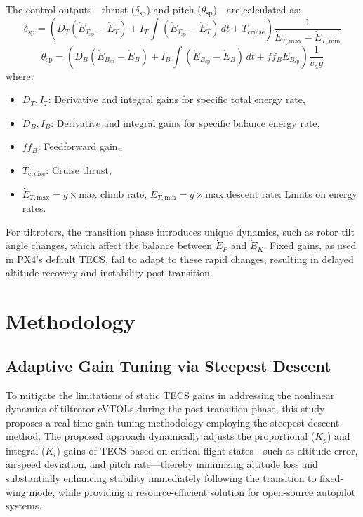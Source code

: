 \documentclass[journal,article,submit,pdftex,moreauthors]{Definitions/mdpi}
\begin{document}
The control outputs—thrust (\(\delta_{\text{sp}}\)) and pitch (\(\theta_{\text{sp}}\))—are calculated as:
\begin{equation}
    \delta_{\text{sp}} = \left( D_T (\dot{E}_{T_{\text{sp}}} - \dot{E}_T) + I_T \int (\dot{E}_{T_{\text{sp}}} - \dot{E}_T) \, dt + T_{\text{cruise}} \right) \frac{1}{\dot{E}_{T,\text{max}} - \dot{E}_{T,\text{min}}}
\end{equation}
\begin{equation}
    \theta_{\text{sp}} = \left( D_B (\dot{E}_{B_{\text{sp}}} - \dot{E}_B) + I_B \int (\dot{E}_{B_{\text{sp}}} - \dot{E}_B) \, dt + ff_B \dot{E}_{B_{\text{sp}}} \right) \frac{1}{v_a g}
\end{equation}
where:
\begin{itemize}
    \item \(D_T, I_T\): Derivative and integral gains for specific total energy rate,
    \item \(D_B, I_B\): Derivative and integral gains for specific balance energy rate,
    \item \(ff_B\): Feedforward gain,
    \item \(T_{\text{cruise}}\): Cruise thrust,
    \item \(\dot{E}_{T,\text{max}} = g \times \text{max\_climb\_rate}\), \(\dot{E}_{T,\text{min}} = g \times \text{max\_descent\_rate}\): Limits on energy rates.
\end{itemize}

For tiltrotors, the transition phase introduces unique dynamics, such as rotor tilt angle changes, which affect the balance between \(\dot{E}_P\) and \(\dot{E}_K\). Fixed gains, as used in PX4’s default TECS, fail to adapt to these rapid changes, resulting in delayed altitude recovery and instability post-transition.

\section{Methodology}

\subsection{Adaptive Gain Tuning via Steepest Descent}
To mitigate the limitations of static TECS gains in addressing the nonlinear dynamics of tiltrotor eVTOLs during the post-transition phase, this study proposes a real-time gain tuning methodology employing the steepest descent method. The proposed approach dynamically adjusts the proportional (\(K_p\)) and integral (\(K_i\)) gains of TECS based on critical flight states—such as altitude error, airspeed deviation, and pitch rate—thereby minimizing altitude loss and substantially enhancing stability immediately following the transition to fixed-wing mode, while providing a resource-efficient solution for open-source autopilot systems.
\end{document}
